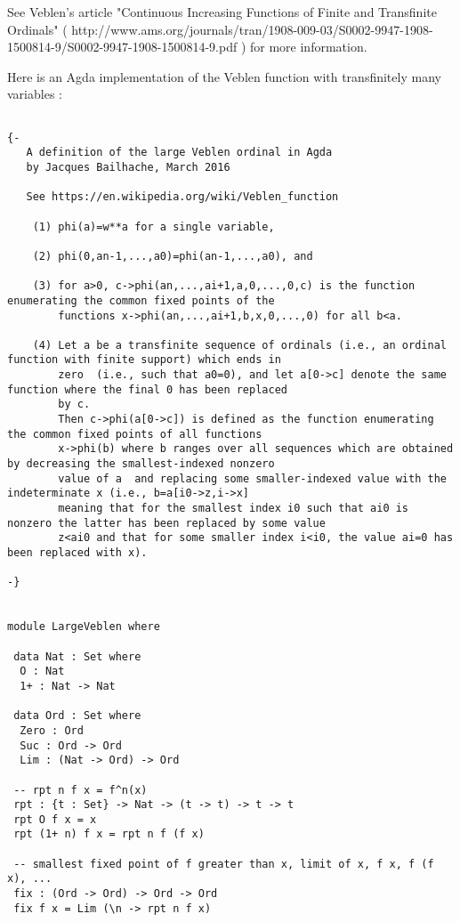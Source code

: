 \documentclass[10pt]{article}
\begin{document}
\bigskip

See Veblen's article "Continuous Increasing Functions of Finite and Transfinite Ordinals" ( http://www.ams.org/journals/tran/1908-009-03/S0002-9947-1908-1500814-9/S0002-9947-1908-1500814-9.pdf ) for more information.

\bigskip

Here is an Agda implementation of the Veblen function with transfinitely many variables :

\begin{verbatim}

{- 
   A definition of the large Veblen ordinal in Agda
   by Jacques Bailhache, March 2016

   See https://en.wikipedia.org/wiki/Veblen_function

    (1) phi(a)=w**a for a single variable,

    (2) phi(0,an-1,...,a0)=phi(an-1,...,a0), and

    (3) for a>0, c->phi(an,...,ai+1,a,0,...,0,c) is the function enumerating the common fixed points of the
        functions x->phi(an,...,ai+1,b,x,0,...,0) for all b<a.

    (4) Let a be a transfinite sequence of ordinals (i.e., an ordinal function with finite support) which ends in 
        zero  (i.e., such that a0=0), and let a[0->c] denote the same function where the final 0 has been replaced 
        by c. 
        Then c->phi(a[0->c]) is defined as the function enumerating the common fixed points of all functions 
        x->phi(b) where b ranges over all sequences which are obtained by decreasing the smallest-indexed nonzero 
        value of a  and replacing some smaller-indexed value with the indeterminate x (i.e., b=a[i0->z,i->x] 
        meaning that for the smallest index i0 such that ai0 is nonzero the latter has been replaced by some value 
        z<ai0 and that for some smaller index i<i0, the value ai=0 has been replaced with x).

-}


module LargeVeblen where

 data Nat : Set where
  O : Nat
  1+ : Nat -> Nat

 data Ord : Set where
  Zero : Ord
  Suc : Ord -> Ord
  Lim : (Nat -> Ord) -> Ord

 -- rpt n f x = f^n(x)
 rpt : {t : Set} -> Nat -> (t -> t) -> t -> t
 rpt O f x = x
 rpt (1+ n) f x = rpt n f (f x)

 -- smallest fixed point of f greater than x, limit of x, f x, f (f x), ...
 fix : (Ord -> Ord) -> Ord -> Ord
 fix f x = Lim (\n -> rpt n f x)


\end{verbatim}
\end{document}
